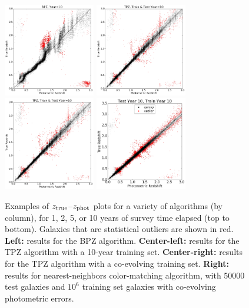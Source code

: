 \documentclass[DM,lsstdraft,toc]{lsstdoc}
\begin{document}
\begin{figure}
\begin{center}
\includegraphics[width=4.0cm]{figures/BPZ_Euclid_Y10_tzpz.png}
\includegraphics[width=4.0cm]{figures/TPZ_Euclid_10Y10_tzpz.png}
\includegraphics[width=4.0cm]{figures/TPZ_Euclid_10Y10_tzpz.png}
\includegraphics[width=4.0cm]{figures/CM_10Y10_tzpz.png}
\caption{Examples of $z_{\rm true}$--$z_{\rm phot}$ plots for a variety of algorithms (by column), for 1, 2, 5, or 10 years of survey time elapsed (top to bottom). Galaxies that are statistical outliers are shown in red. {\bf Left:} results for the BPZ algorithm. {\bf Center-left:} results for the TPZ algorithm with a 10-year training set. {\bf Center-right:} results for the TPZ algorithm with a co-evolving training set. {\bf Right:} results for nearest-neighbors color-matching algorithm, with 50000 test galaxies and $10^6$ training set galaxies with co-evolving photometric errors. \label{fig:tzpz}}
\end{center}
\end{figure}
\end{document}
